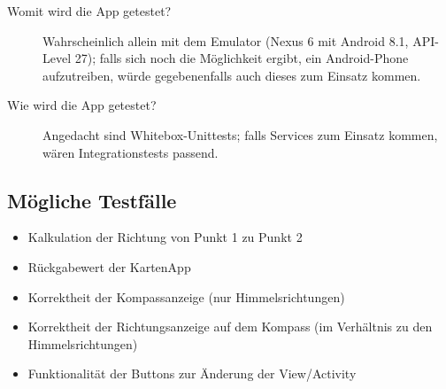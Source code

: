 \documentclass[12pt,a4paper]{scrartcl}
\begin{document}
\begin{description}
  \item [Womit wird die App getestet?] Wahrscheinlich allein mit dem Emulator (Nexus 6 mit Android 8.1, API-Level 27); falls sich noch die Möglichkeit ergibt, ein Android-Phone aufzutreiben, würde gegebenenfalls auch dieses zum Einsatz kommen.
  \item [Wie wird die App getestet?] Angedacht sind Whitebox-Unittests; falls Services zum Einsatz kommen, wären Integrationstests passend.
\end{description}

\subsection{Mögliche Testfälle}

\begin{itemize}
  \item Kalkulation der Richtung von Punkt 1 zu Punkt 2
  \item Rückgabewert der KartenApp
  \item Korrektheit der Kompassanzeige (nur Himmelsrichtungen)
  \item Korrektheit der Richtungsanzeige auf dem Kompass (im Verhältnis zu den Himmelsrichtungen)
  \item Funktionalität der Buttons zur Änderung der View/Activity
\end{itemize}

%
\end{document}
